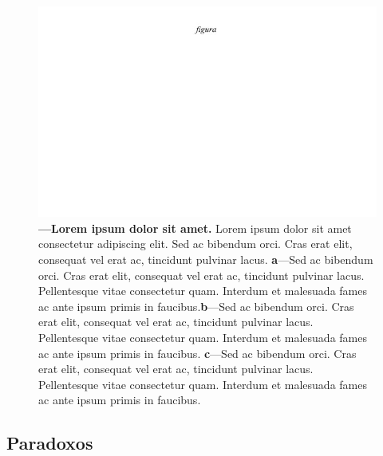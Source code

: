\documentclass[./main.tex]{subfiles}
\begin{document}
\begin{figure}[t!] 
\centering				
\includegraphics[width=0.95\linewidth]{figs/fig_m.jpg}		
\caption[Lorem ipsum dolor sit amet]
{\textbf{---\;Lorem ipsum dolor sit amet.}
    Lorem ipsum dolor sit amet consectetur adipiscing elit. Sed ac bibendum orci. Cras erat elit, consequat vel erat ac, tincidunt pulvinar lacus. \;\textbf{a}\;---\;Sed ac bibendum orci. Cras erat elit, consequat vel erat ac, tincidunt pulvinar lacus. Pellentesque vitae consectetur quam. Interdum et malesuada fames ac ante ipsum primis in faucibus.\;\textbf{b}\;---\;Sed ac bibendum orci. Cras erat elit, consequat vel erat ac, tincidunt pulvinar lacus. Pellentesque vitae consectetur quam. Interdum et malesuada fames ac ante ipsum primis in faucibus. \;\textbf{c}\;---\;Sed ac bibendum orci. Cras erat elit, consequat vel erat ac, tincidunt pulvinar lacus. Pellentesque vitae consectetur quam. Interdum et malesuada fames ac ante ipsum primis in faucibus.
}
\label{fig:hydro:topo} 		
\end{figure}

\subsection{Paradoxos}

\end{document}
